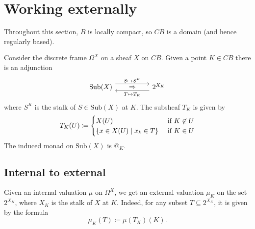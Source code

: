 \documentclass[11pt, oneside, article]{memoir}
\makeatletter
\theoremstyle{plain}
\theoremstyle{definition}
\theoremstyle{remark}
\renewcommand{\ss}{\subseteq}
\newcommand{\Set}[1]{\mathrm{#1}}
\newcommand{\tn}[1]{\textnormal{#1}}
\newcommand{\Sub}{\Set{Sub}}
\newcommand{\AtSymbol}{{@}}
\newcommand{\At}[2][]{\AtSymbol^{#1}_{#2}}
\newcommand{\adj}[5][30pt]{%
\begin{tikzcd}[ampersand replacement=\&, column sep=#1]
  #2\ar[r, shift left=5pt, "{#3}"]\ar[r, phantom, "\Rightarrow" yshift=-.4pt]\&
  #5\ar[l, shift left=5pt, "{#4}"]
\end{tikzcd}
}
\makeatother
\begin{document}
\section{Working externally}

Throughout this section, $B$ is locally compact, so $CB$ is a domain (and hence regularly based).

Consider the discrete frame $\Omega^X$ on a sheaf $X$ on $CB$. Given a point $K\in CB$ there is an adjunction
\begin{equation}\label{eqn.stalk}
\adj[50pt]{\Sub(X)}{S\mapsto S^K}{T\mapsto T_K}{2^{X_K}}
\end{equation}
where $S^K$ is the stalk of $S\in\Sub(X)$ at $K$. The subsheaf $T_K$ is given by
\[
  T_K(U)\coloneqq
  \begin{cases}
  	X(U)& \tn{ if }K\not\in U\\
		\{x\in X(U)\mid x_k\in T\}&\tn{ if }K\in U
  \end{cases}
\]
The induced monad on $\Sub(X)$ is $\At{K}$.

\subsection{Internal to external}
Given an internal valuation $\mu$ on $\Omega^X$, we get an external valuation $\mu_K$ on the set $2^{X_K}$, where $X_K$ is the stalk of $X$ at $K$. Indeed, for any subset $T\ss 2^{X_K}$, it is given by the formula
\[\mu_K(T)\coloneqq\mu(T_K)(K).\]
\end{document}
